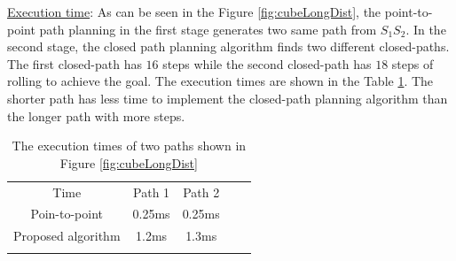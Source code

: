 
\noindent \uline{Execution time}:
As can be seen in the Figure \ref{fig:cubeLongDist}, the point-to-point path planning in the first stage generates two same path from $S_1S_2$. In the second stage, the closed path planning algorithm finds two different closed-paths. The first closed-path has $16$ steps while the second closed-path has $18$ steps of rolling to achieve the goal.
The execution times are shown in the Table \ref{tab:timeCubeExtension}. The shorter path has less time to implement the closed-path planning algorithm than the longer path with more steps.\\

\begin{table}[H]
\caption{The execution times of two paths shown in Figure \ref{fig:cubeLongDist}}
\centering
\begin{tabular}{cccll}
\cline{1-3}
\multicolumn{1}{|c|}{Time}          & \multicolumn{1}{c|}{Path 1} & \multicolumn{1}{c|}{Path 2} &  &  \\ \cline{1-3}
\multicolumn{1}{|c|}{Poin-to-point} & \multicolumn{1}{c|}{0.25ms}    & \multicolumn{1}{c|}{0.25ms}    &  &  \\ \cline{1-3}
\multicolumn{1}{|c|}{Proposed algorithm} & \multicolumn{1}{c|}{1.2ms} & \multicolumn{1}{c|}{1.3ms} &  &  \\ \cline{1-3}
\multicolumn{1}{l}{}                & \multicolumn{1}{l}{}        & \multicolumn{1}{l}{}        &  & 
\end{tabular}
\label{tab:timeCubeExtension}
\end{table}

